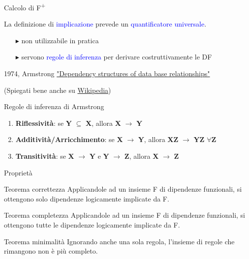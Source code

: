 \documentclass{beamer}
\begin{document}
\begin{frame}{Calcolo di F\textsuperscript{+}}

    La definizione di \textcolor{blue}{implicazione} prevede un \textcolor{blue}{quantificatore universale}.
    \begin{itemize}
        \item[$\blacktriangleright$] non utilizzabile in pratica
        \item[$\blacktriangleright$] servono \textcolor{blue}{regole di inferenza} per derivare costruttivamente le DF
    \end{itemize}
    \vfill
    1974, Armstrong \href{https://web.archive.org/web/20180126091352if_/https://ipfs.io/ipfs/QmWYWTGUZyTm2iRFTZY2pTr2x1vWkDiJr2CBp2PGVpSVSv}{"Dependency structures of data base relationships"}\par
    (Spiegati bene anche su \href{https://it.wikipedia.org/wiki/Assiomi_di_Armstrong}{Wikipedia})
    
    \vfill
\end{frame}

\begin{frame}{Regole di inferenza di Armstrong}
    \begin{enumerate}
        \item \textbf{Riflessività}: se \textbf{Y} $\subseteq$ \textbf{X}, allora \textbf{X} $\rightarrow$ \textbf{Y}
        \item \textbf{Additività/Arricchimento}: se \textbf{X} $\rightarrow$ \textbf{Y}, allora \textbf{XZ} $\rightarrow$ \textbf{YZ} $\forall$\textbf{Z}
        \item \textbf{Transitività}: se \textbf{X} $\rightarrow$ \textbf{Y} e \textbf{Y} $\rightarrow$ \textbf{Z}, allora \textbf{X} $\rightarrow$ \textbf{Z}
    \end{enumerate}
\end{frame}

\begin{frame}{Proprietà}
    \begin{block}{Teorema correttezza}
    Applicandole ad un insieme F di dipendenze funzionali, si ottengono solo dipendenze logicamente implicate da F.
    \end{block}
    
    \begin{block}{Teorema completezza}
    Applicandole ad un insieme F di dipendenze funzionali, si ottengono tutte le dipendenze logicamente implicate da F.
    \end{block}
    
    \begin{block}{Teorema minimalità}
    Ignorando anche una sola regola, l’insieme di regole che rimangono non è più completo.
    \end{block}
\end{frame}
\end{document}
